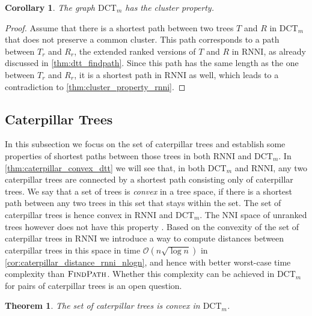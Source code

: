 \documentclass[11pt]{amsart}
\newtheorem{theorem}{Theorem}
\newtheorem{corollary}{Corollary}
\newcommand{\rnni}{\mathrm{RNNI}}
\newcommand{\findpath}{\textsc{FindPath}}
\newcommand{\nni}{\mathrm{NNI}}
\newcommand{\dct}{\mathrm{DCT}}
\renewcommand{\O}{\mathcal O}
\newcommand{\summary}[1]{} %
\begin{document}
\begin{corollary}
	The graph $\dct_m$ has the cluster property.
	\label{cor:cluster_property_dct}
\end{corollary}

\begin{proof}
	Assume that there is a shortest path between two trees $T$ and $R$ in $\dct_m$ that does not preserve a common cluster.
	This path corresponds to a path between $T_r$ and $R_r$, the extended ranked versions of $T$ and $R$ in $\rnni$, as already discussed in \autoref{thm:dtt_findpath}.
	Since this path has the same length as the one between $T_r$ and $R_r$, it is a shortest path in $\rnni$ as well, which leads to a contradiction to \autoref{thm:cluster_property_rnni}.
\end{proof}

\subsection{Caterpillar Trees}
\label{section:caterpillar_convex}

\summary{Defining Caterpillar trees.
Why are they interesting?}
In this subsection we focus on the set of caterpillar trees and establish some properties of shortest paths between those trees in both $\rnni$ and $\dct_m$.
In \autoref{thm:caterpillar_convex_dtt} we will see that, in both $\dct_m$ and $\rnni$, any two caterpillar trees are connected by a shortest path consisting only of caterpillar trees.
We say that a set of trees is \emph{convex} in a tree space, if there is a shortest path between any two trees in this set that stays within the set.
The set of caterpillar trees is hence convex in $\rnni$ and $\dct_m$.
The $\nni$ space of unranked trees however does not have this property \autocite{Gavryushkin2018-ol}.
Based on the convexity of the set of caterpillar trees in $\rnni$ we introduce a way to compute distances between caterpillar trees in this space in time $\O(n \sqrt{\log n})$ in \autoref{cor:caterpillar_distance_rnni_nlogn}, and hence with better worst-case time complexity than $\findpath$.
Whether this complexity can be achieved in $\dct_m$ for pairs of caterpillar trees is an open question.

\begin{theorem}
	The set of caterpillar trees is convex in $\dct_m$.
	\label{thm:caterpillar_convex_dtt}
\end{theorem}
\end{document}
